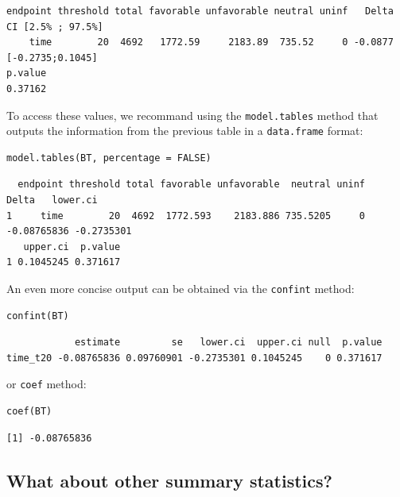\documentclass[12pt]{article}
\begin{document}
\begin{verbatim}
endpoint threshold total favorable unfavorable neutral uninf   Delta CI [2.5% ; 97.5%]
    time        20  4692   1772.59     2183.89  735.52     0 -0.0877  [-0.2735;0.1045]
p.value
0.37162
\end{verbatim}


\bigskip

To access these values, we recommand using the \texttt{model.tables} method
that outputs the information from the previous table in a \texttt{data.frame}
format:

\lstset{language=r,label= ,caption= ,captionpos=b,numbers=none}
\begin{lstlisting}
model.tables(BT, percentage = FALSE)
\end{lstlisting}

\begin{verbatim}
  endpoint threshold total favorable unfavorable  neutral uninf       Delta   lower.ci
1     time        20  4692  1772.593    2183.886 735.5205     0 -0.08765836 -0.2735301
   upper.ci  p.value
1 0.1045245 0.371617
\end{verbatim}


\bigskip

An even more concise output can be obtained via the \texttt{confint} method:
\lstset{language=r,label= ,caption= ,captionpos=b,numbers=none}
\begin{lstlisting}
confint(BT)
\end{lstlisting}

\begin{verbatim}
            estimate         se   lower.ci  upper.ci null  p.value
time_t20 -0.08765836 0.09760901 -0.2735301 0.1045245    0 0.371617
\end{verbatim}


or \texttt{coef} method:
\lstset{language=r,label= ,caption= ,captionpos=b,numbers=none}
\begin{lstlisting}
coef(BT)
\end{lstlisting}

\begin{verbatim}
[1] -0.08765836
\end{verbatim}


\bigskip

\subsection{What about other summary statistics?}
\label{sec:orga7c1a6c}
\end{document}
